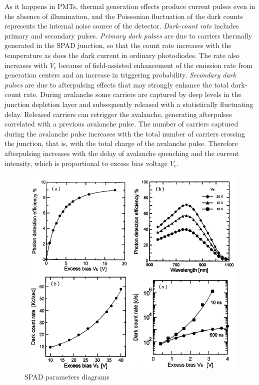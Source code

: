 As it happens in \ac{PMT}s, thermal generation effects produce current pulses even in the absence of illumination, and the Poissonian fluctuation of the dark counts represents the internal noise source of the detector. \textit{Dark-count rate} includes primary and secondary pulses. \textit{Primary dark pulses} are due to carriers thermally generated in the \acs{SPAD} junction, so that the count rate increases with the temperature as does the dark current in ordinary photodiodes. The rate also increases with $V_e$ because of field-assisted enhancement of the emission rate from generation centers and an increase in triggering probability. \textit{Secondary dark pulses} are due to afterpulsing effects that may strongly enhance the total dark-count rate. During avalanche some carriers are captured by deep levels in the junction depletion layer and subsequently released with a statistically fluctuating delay. Released carriers can retrigger the avalanche, generating afterpulses correlated with a previous avalanche pulse. The number of carriers captured during the avalanche pulse increases with the total number of carriers crossing the junction, that is, with the total charge of the avalanche pulse. Therefore afterpulsing increases with the delay of avalanche quenching and the current intensity, which is proportional to excess bias voltage $V_e$.

\begin{figure} [ht]
\centering
\includegraphics[scale=0.8]{chapters/img/SPAD_Ve_functions.png}	
\caption{\acs{SPAD} parameters diagrams }
\label{spad}
\end{figure}

